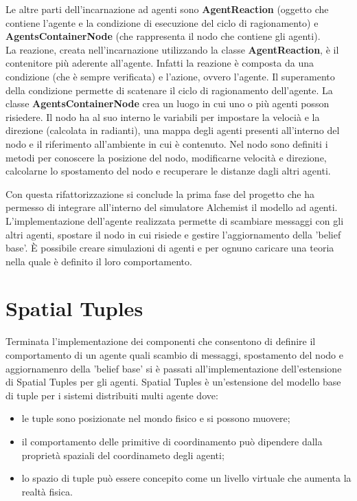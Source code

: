 \documentclass[12pt,a4paper,openright,twoside]{report}
\begin{document}
Le altre parti dell'incarnazione ad agenti sono \textbf{AgentReaction} (oggetto che contiene l'agente e la condizione di esecuzione del ciclo di ragionamento) e \textbf{AgentsContainerNode} (che rappresenta il nodo che contiene gli agenti).
\\
La reazione, creata nell'incarnazione utilizzando la classe \textbf{AgentReaction}, \`e il contenitore pi\`u aderente all'agente. Infatti la reazione \`e composta da una condizione (che \`e sempre verificata) e l'azione, ovvero l'agente. Il superamento della condizione permette di scatenare il ciclo di ragionamento dell'agente.
La classe \textbf{AgentsContainerNode} crea un luogo in cui uno o pi\`u agenti posson risiedere. Il nodo ha al suo interno le variabili per impostare la veloci\`a e la direzione (calcolata in radianti), una mappa degli agenti presenti all'interno del nodo e il riferimento all'ambiente in cui \`e contenuto. Nel nodo sono definiti i metodi per conoscere la posizione del nodo, modificarne velocit\`a e direzione, calcolarne lo spostamento del nodo e recuperare le distanze dagli altri agenti.

\bigskip

Con questa rifattorizzazione si conclude la prima fase del progetto che ha permesso di integrare all'interno del simulatore Alchemist il modello ad agenti. L'implementazione dell'agente realizzata permette di scambiare messaggi con gli altri agenti, spostare il nodo in cui risiede e gestire l'aggiornamento della 'belief base'. \`E possibile creare simulazioni di agenti e per ognuno caricare una teoria nella quale \`e definito il loro comportamento.

\chapter{Spatial Tuples}
Terminata l'implementazione dei componenti che consentono di definire il comportamento di un agente quali scambio di messaggi, spostamento del nodo e aggiornamenro della 'belief base' si \`e passati all'implementazione dell'estensione di Spatial Tuples per gli agenti.
Spatial Tuples \`e un'estensione del modello base di tuple per i sistemi distribuiti multi agente dove:
\begin{itemize}
   \item le tuple sono posizionate nel mondo fisico e si possono muovere;
   \item il comportamento delle primitive di coordinamento pu\`o dipendere dalla propriet\`a spaziali del coordinameto degli agenti;
   \item lo spazio di tuple pu\`o essere concepito come un livello virtuale che aumenta la realt\`a fisica.
\end{itemize}
\end{document}
